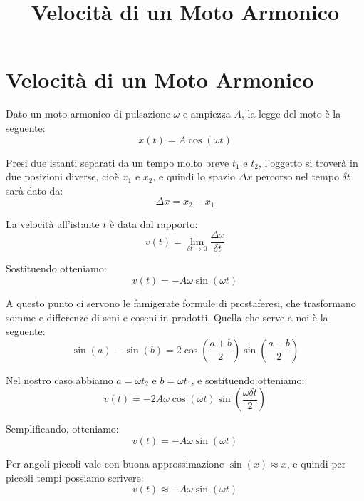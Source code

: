 \documentclass{article}
\title{Velocit\`a di un Moto Armonico}
\author{}
\date{}
\begin{document}
\maketitle

\section*{Velocit\`a di un Moto Armonico}

Dato un moto armonico di pulsazione $\omega$ e ampiezza $A$, la legge del moto \`e la seguente:
\begin{equation}
    x(t) = A \cos(\omega t)
\end{equation}

Presi due istanti separati da un tempo molto breve $t_1$ e $t_2$, l'oggetto si trover\`a in due posizioni diverse, cio\`e $x_1$ e $x_2$, e quindi lo spazio $\Delta x$ percorso nel tempo $\delta t$ sar\`a dato da:
\begin{equation}
    \Delta x = x_2 - x_1
\end{equation}

La velocit\`a all'istante $t$ \`e data dal rapporto:
\begin{equation}
    v(t) = \lim_{\delta t \to 0} \frac{\Delta x}{\delta t}
\end{equation}

Sostituendo otteniamo:
\begin{equation}
    v(t) = -A \omega \sin(\omega t)
\end{equation}

A questo punto ci servono le famigerate formule di prostaferesi, che trasformano somme e differenze di seni e coseni in prodotti. Quella che serve a noi \`e la seguente:
\begin{equation}
    \sin(a) - \sin(b) = 2 \cos\left(\frac{a + b}{2}\right) \sin\left(\frac{a - b}{2}\right)
\end{equation}

Nel nostro caso abbiamo $a = \omega t_2$ e $b = \omega t_1$, e sostituendo otteniamo:
\begin{equation}
    v(t) = -2 A \omega \cos\left(\omega t\right) \sin\left(\frac{\omega \delta t}{2}\right)
\end{equation}

Semplificando, otteniamo:
\begin{equation}
    v(t) = -A \omega \sin(\omega t)
\end{equation}

Per angoli piccoli vale con buona approssimazione $\sin(x) \approx x$, e quindi per piccoli tempi possiamo scrivere:
\begin{equation}
    v(t) \approx -A \omega \sin(\omega t)
\end{equation}
\end{document}
